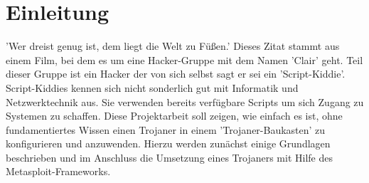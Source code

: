 \section{Einleitung}\label{sec:einleitung}
'Wer dreist genug ist, dem liegt die Welt zu Füßen.' Dieses Zitat stammt aus einem Film, 
bei dem es um eine Hacker-Gruppe mit dem Namen 'Clair' geht. Teil dieser Gruppe ist 
ein Hacker der von sich selbst sagt er sei ein 'Script-Kiddie'. Script-Kiddies
kennen sich nicht sonderlich gut mit Informatik und Netzwerktechnik aus. Sie
verwenden bereits verfügbare Scripts um sich Zugang zu Systemen zu schaffen. 
Diese Projektarbeit soll zeigen, wie einfach es ist, ohne fundamentiertes Wissen
einen Trojaner in einem 'Trojaner-Baukasten' zu konfigurieren und anzuwenden. 
Hierzu werden zunächst einige Grundlagen beschrieben und im Anschluss die Umsetzung
eines Trojaners mit Hilfe des Metasploit-Frameworks.